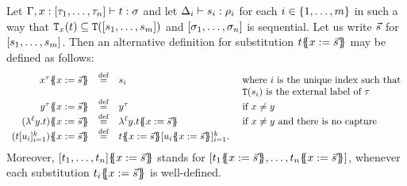 \begin{definition}
Let $\Gamma,x : [\tau_1,\hdots,\tau_n] \vdash t : \sigma$
and let $\Delta_i \vdash s_i : \rho_i$ for each $i \in \{1,\hdots,m\}$
in such a way that $\mathtt{T}_{x}(t) \subseteq \mathtt{T}([s_1,\hdots,s_m])$
and $[\sigma_1,\hdots,\sigma_n]$ is sequential.
Let us write $\vec{s}$ for $[s_1,\hdots,s_m]$.
Then an alternative definition for substitution $t\{\!\!\{x := \vec{s}\}\!\!\}$
may be defined as follows:
\[
  \begin{array}{rcll}
    \var^{\typ}\sub{\var}{\ls{\tmtwo}}                 & \eqdef & \tmtwo_i & \text{ where $i$ is the unique index such that} \\
                                                                         &&& \text{ $\tmlabel{\tmtwo_i}$ is the external label of $\typ$}\\
    \vartwo^{\typ}\sub{\var}{\ls{\tmtwo}}              & \eqdef & \vartwo^\typ & \text{ if $\var \neq \vartwo$} \\
    (\lamp{\lab}{\vartwo}{\tm})\sub{\var}{\ls{\tmtwo}} & \eqdef & \lamp{\lab}{\vartwo}{\tm\sub{\var}{\ls{\tmtwo}}} & \text{ if $\var \neq \vartwo$ and there is no capture}\\
    (\tm[\tmthree_i]_{i=1}^{k})\sub{\var}{\ls{\tmtwo}} & \eqdef & \tm\sub{\var}{\ls{\tmtwo}}[\tmthree_i\sub{\var}{\ls{\tmtwo}}]_{i=1}^{k}.
  \end{array}
\]
Moreover,
$[t_1,\hdots,t_n]\{\!\!\{x := \vec{s}\}\!\!\}$
stands for $[\tm_1\sub{\var}{\ls{\tmtwo}},\hdots,\tm_n\sub{\var}{\ls{\tmtwo}}]$,
whenever each substitution $t_i\{\!\!\{x := \vec{s}\}\!\!\}$ is well-defined.
\end{definition}

